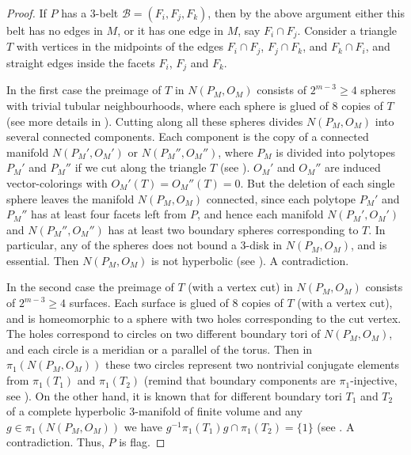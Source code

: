 \documentclass[12pt]{amsart}
\theoremstyle{definition}
\theoremstyle{remark}
\begin{document}
\begin{proof}
If $P$ has a $3$-belt $\mathcal{B}=(F_i,F_j,F_k)$, 
then by the above argument either this belt has no edges in $M$, or it has one edge in $M$, say $F_i\cap F_j$. Consider a triangle $T$
with vertices in the midpoints of the edges $F_i\cap F_j$, $F_j\cap F_k$, and $F_k\cap F_i$, and straight 
edges inside the facets $F_i$, $F_j$ and $F_k$. 

In the first case the preimage of $T$ in $N(P_M,O_M)$
consists of $2^{m-3}\geqslant 4$ spheres with trivial tubular neighbourhoods, where each sphere is glued of $8$ copies of $T$ (see 
more details in \cite[Proposition 3.6]{E22a}). 
Cutting along all these spheres divides $N(P_M,O_M)$ into several connected 
components. Each component is the copy of a connected manifold $N(P_M',O_M')$ or $N(P_M'',O_M'')$, where $P_M$ is 
divided into polytopes $P_M'$ and $P_M''$ if we cut along the triangle
$T$ (see \cite[Corollary 2.27]{E22a}). $O_M'$ and $O_M''$ are induced vector-colorings with $O_M'(T)=O_M''(T)=0$.
But the deletion of each single sphere leaves the manifold $N(P_M,O_M)$ connected, since each polytope  $P_M'$ and $P_M''$
has at least four facets left from $P$, and hence each manifold $N(P_M',O_M')$ and $N(P_M'',O_M'')$ has at least two 
boundary spheres corresponding to $T$. In particular, any of the spheres does not bound a $3$-disk in $N(P_M,O_M)$, 
and is essential.
Then $N(P_M,O_M)$ is not hyperbolic (see \cite[Theorem 2.9]{B02}). A contradiction.

In the second case the preimage of $T$ (with a vertex cut) in $N(P_M,O_M)$
consists of $2^{m-3}\geqslant 4$ surfaces. Each surface is glued of $8$ copies of $T$ (with a vertex cut), 
and is homeomorphic to a sphere with two holes corresponding to the cut vertex. The holes correspond to
circles on two different boundary tori of $N(P_M,O_M)$, and each circle is a meridian or a parallel of the torus.
Then in $\pi_1(N(P_M,O_M))$ these two circles represent two nontrivial conjugate elements from $\pi_1(T_1)$ and $\pi_1(T_2)$ 
(remind that boundary components are $\pi_1$-injective, see 
\cite[Proposition D.3.18(1)]{BP92}). 
On the other hand, it is known that for different boundary tori
$T_1$ and $T_2$ of a complete hyperbolic $3$-manifold of finite volume and any $g\in \pi_1(N(P_M,O_M))$ we have
$g^{-1}\pi_1(T_1)g\cap \pi_1(T_2)=\{1\}$ (see \cite[Lemma 3.4(2)]{F11}. A contradiction. Thus, $P$ is flag.


\end{proof}
\end{document}
